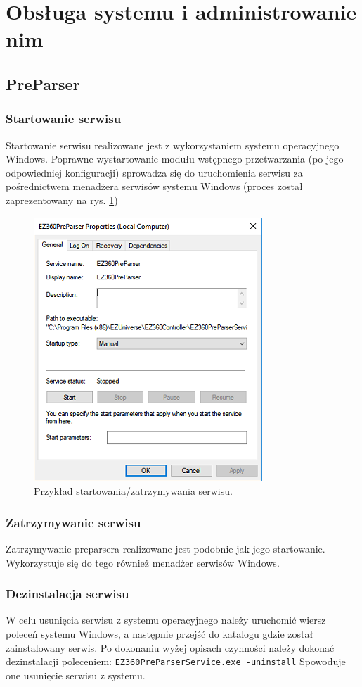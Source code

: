 \documentclass[a4paper]{book}
\begin{document}
\section{Obsługa systemu i administrowanie nim}
\subsection{PreParser}
\subsubsection{Startowanie serwisu}
Startowanie serwisu realizowane jest z wykorzystaniem systemu operacyjnego Windows. Poprawne wystartowanie modułu wstępnego przetwarzania (po jego odpowiedniej konfiguracji) sprowadza się do uruchomienia serwisu za pośrednictwem menadżera serwisów systemu Windows (proces został zaprezentowany na rys. \ref{fig:startowanie_serwisu})
\begin{figure}[t]
	\centering
	\includegraphics{./img/startowanie_serwisu.png}
	\caption{Przykład startowania/zatrzymywania serwisu.}
	\label{fig:startowanie_serwisu}
\end{figure}
\subsubsection{Zatrzymywanie serwisu}
Zatrzymywanie preparsera realizowane jest podobnie jak jego startowanie. Wykorzystuje się do tego również menadżer serwisów Windows.
\subsubsection{Dezinstalacja serwisu}
W celu usunięcia serwisu z systemu operacyjnego należy uruchomić wiersz poleceń systemu Windows, a następnie przejść do katalogu gdzie został zainstalowany serwis. Po dokonaniu wyżej opisach czynności należy dokonać dezinstalacji poleceniem: \newline
\texttt{EZ360PreParserService.exe -uninstall}
\newline Spowoduje one usunięcie serwisu z systemu. 
\end{document}
